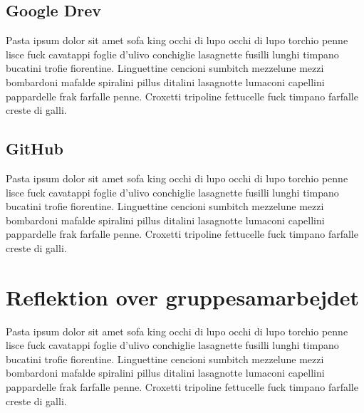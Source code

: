\subsection{Google Drev}
Pasta ipsum dolor sit amet sofa king occhi di lupo occhi di lupo torchio penne lisce fuck cavatappi foglie d'ulivo conchiglie lasagnette fusilli lunghi timpano bucatini trofie fiorentine. Linguettine cencioni sumbitch mezzelune mezzi bombardoni mafalde spiralini pillus ditalini lasagnotte lumaconi capellini pappardelle frak farfalle penne. Croxetti tripoline fettucelle fuck timpano farfalle creste di galli.

\subsection{GitHub}
Pasta ipsum dolor sit amet sofa king occhi di lupo occhi di lupo torchio penne lisce fuck cavatappi foglie d'ulivo conchiglie lasagnette fusilli lunghi timpano bucatini trofie fiorentine. Linguettine cencioni sumbitch mezzelune mezzi bombardoni mafalde spiralini pillus ditalini lasagnotte lumaconi capellini pappardelle frak farfalle penne. Croxetti tripoline fettucelle fuck timpano farfalle creste di galli.

\section{Reflektion over gruppesamarbejdet}
Pasta ipsum dolor sit amet sofa king occhi di lupo occhi di lupo torchio penne lisce fuck cavatappi foglie d'ulivo conchiglie lasagnette fusilli lunghi timpano bucatini trofie fiorentine. Linguettine cencioni sumbitch mezzelune mezzi bombardoni mafalde spiralini pillus ditalini lasagnotte lumaconi capellini pappardelle frak farfalle penne. Croxetti tripoline fettucelle fuck timpano farfalle creste di galli.